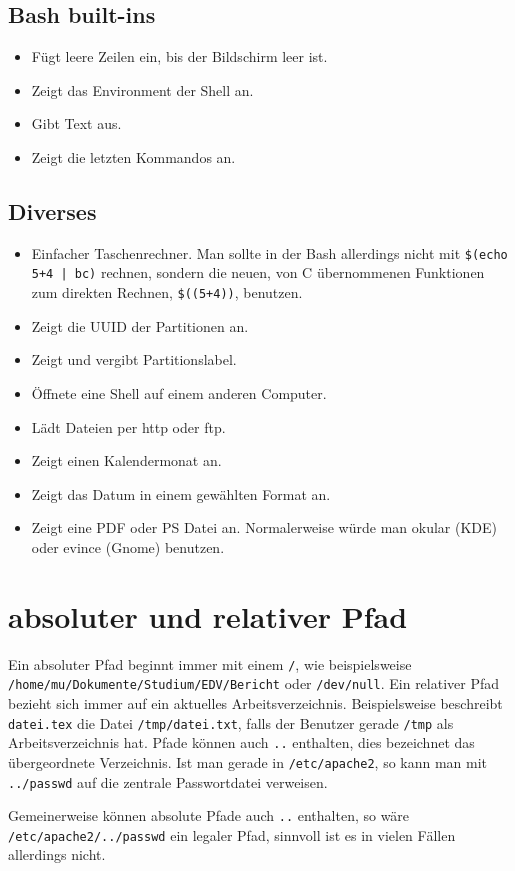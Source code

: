 \documentclass[12pt]{report}
\newcommand\dd[2]{\item[\texttt{#1}] #2}
\begin{document}
\subsection{Bash built-ins}
\begin{itemize}
\dd{clear}{Fügt leere Zeilen ein, bis der Bildschirm leer ist.}
\dd{set}{Zeigt das Environment der Shell an.}
\dd{echo}{Gibt Text aus.}
\dd{history}{Zeigt die letzten Kommandos an.}
\end{itemize}

\subsection{Diverses}
\begin{itemize}
\dd{bc}{Einfacher Taschenrechner. Man sollte in der Bash allerdings nicht mit \texttt{\$(echo 5+4 | bc)} rechnen, sondern die neuen, von C übernommenen Funktionen zum direkten Rechnen, \texttt{\$((5+4))}, benutzen.}
\dd{blkid}{Zeigt die UUID der Partitionen an.}
\dd{e2label}{Zeigt und vergibt Partitionslabel.}
\dd{ssh}{Öffnete eine Shell auf einem anderen Computer.}
\dd{wget}{Lädt Dateien per http oder ftp.}
\dd{cal}{Zeigt einen Kalendermonat an.}
\dd{date}{Zeigt das Datum in einem gewählten Format an.}
\dd{gv}{Zeigt eine PDF oder PS Datei an. Normalerweise würde man okular (KDE) oder evince (Gnome) benutzen.}
\end{itemize}

\section{absoluter und relativer Pfad}

Ein absoluter Pfad beginnt immer mit einem \texttt{/}, wie beispielsweise \\ \texttt{/home/mu/Dokumente/Studium/EDV/Bericht} oder \texttt{/dev/null}. Ein relativer Pfad bezieht sich immer auf ein aktuelles Arbeitsverzeichnis. Beispielsweise beschreibt \texttt{datei.tex} die Datei \texttt{/tmp/datei.txt}, falls der Benutzer gerade \texttt{/tmp} als Arbeitsverzeichnis hat. Pfade können auch \texttt{..} enthalten, dies bezeichnet das übergeordnete Verzeichnis. Ist man gerade in \texttt{/etc/apache2}, so kann man mit \texttt{../passwd} auf die zentrale Passwortdatei verweisen.

Gemeinerweise können absolute Pfade auch \texttt{..} enthalten, so wäre \\
\texttt{/etc/apache2/../passwd} ein legaler Pfad, sinnvoll ist es in vielen Fällen allerdings nicht.
\end{document}
